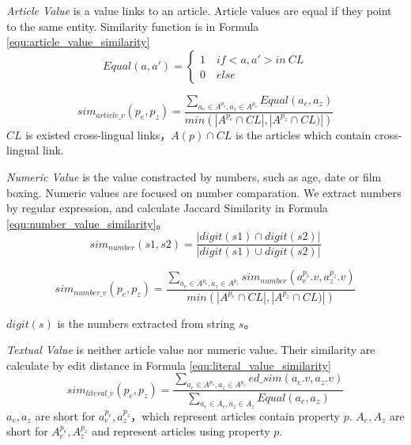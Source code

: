 \documentclass[runningheads,a4paper]{llncs}
\begin{document}
\textit{Article Value} is a value links to an article. Article values are equal if they point to the same entity. Similarity function is in Formula \ref{equ:article_value_similarity}
\begin{equation}
Equal(a,a')=\left\{\begin{matrix}
1 \quad  if <a,a'> in \ CL\\
0 \quad  else
\end{matrix}\right.
\end{equation}

\begin{equation}
\label{equ:article_value_similarity}
sim_{article\_v}(p_e, p_z) = \frac{\sum_{a_e\in A^{p_e}, a_z \in A^{p_z}} Equal(a_e, a_z)}{min(\left| A^{p_e}\cap CL \right|, \left|A^{p_z} \cap CL) \right|)}
\end{equation}
$CL$ is existed cross-lingual links，$A(p)\cap CL$ is the articles which contain cross-lingual link.

\textit{Numeric Value} is the value constracted by numbers, such as age, date or film boxing. Numeric values are focused on number comparation. We extract numbers by regular expression, and calculate Jaccard Similarity in Formula \ref{equ:number_value_similarity}。
\begin{equation}
sim_{number}(s1, s2) = \frac { |digit(s1) \cap digit(s2)| }{ |digit(s1) \cup digit(s2)| }
\end{equation}

\begin{equation}
\label{equ:number_value_similarity}
sim_{number\_v}(p_e, p_z) = \frac{\sum_{a_e\in A^{p_e}, a_z \in A^{p_z}} sim_{number}(a_e^{p_e}.v, a_z^{p_z}.v)}{min(\left| A^{p_e}\cap CL \right|, \left|A^{p_z} \cap CL) \right|)}
\end{equation}

$digit(s)$ is the numbers extracted from string $s$。

\textit{Textual Value} is neither article value nor numeric value. Their similarity are calculate by edit distance in Formula \ref{equ:literal_value_similarity}
\begin{equation}
\label{equ:literal_value_similarity}
sim_{literal\_v}(p_e, p_z) = \frac { \sum _{ { a }_{ e }\in { A }^{p_e },{ a }_{ z }\in { A }^{p_z } }{ ed\_sim\left( { a }_{ e }.v,{ a }_{ z }.v \right)  }  }{ \sum _{ { a }_{ e }\in { A }_{ e },{ a }_{ z }\in { A }_{ z } }{ Equal\left( { a }_{ e },{ a }_{ z } \right)  }  }
\end{equation}
$a_e, a_z$ are short for $a_e^{p_e}, a_z^{p_z}$，which represent articles contain property $p$. $A_e, A_z$ are short for $A_e^{p_e},A_z^{p_z}$ and represent articles using property $p$.
\end{document}
